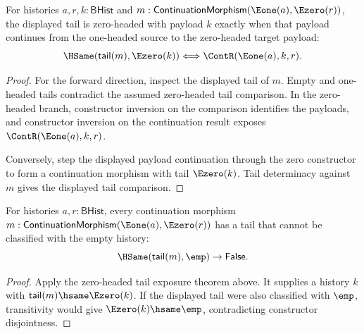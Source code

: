 \begin{theorem}
\label{thm:category-continuation-morphism-e1-source-e0-target-tail-e0-iff}
For histories $a,r,k:\mathsf{BHist}$ and
$m:\mathsf{ContinuationMorphism}(\Eone(a),\Ezero(r))$, the displayed tail is
zero-headed with payload $k$ exactly when that payload continues from the
one-headed source to the zero-headed target payload:
$$
\HSame(\mathsf{tail}(m),\Ezero(k))
\Longleftrightarrow
\ContR(\Eone(a),k,r).
$$
\end{theorem}
\begin{proof}
For the forward direction, inspect the displayed tail of $m$. Empty and
one-headed tails contradict the assumed zero-headed tail comparison. In the
zero-headed branch, constructor inversion on the comparison identifies the
payloads, and constructor inversion on the continuation result exposes
$\ContR(\Eone(a),k,r)$.

Conversely, step the displayed payload continuation through the zero
constructor to form a continuation morphism with tail $\Ezero(k)$. Tail
determinacy against $m$ gives the displayed tail comparison.
\end{proof}

\begin{theorem}
\label{thm:continuation-morphism-e1-source-e0-target-tail-not-empty}
For histories $a,r:\mathsf{BHist}$, every continuation morphism
$m:\mathsf{ContinuationMorphism}(\Eone(a),\Ezero(r))$ has a tail that cannot be
classified with the empty history:
$$
\HSame(\mathsf{tail}(m),\emp)\to\mathsf{False}.
$$
\end{theorem}
\begin{proof}
Apply the zero-headed tail exposure theorem above. It supplies a history $k$
with $\mathsf{tail}(m)\hsame\Ezero(k)$. If the displayed tail were also
classified with $\emp$, transitivity would give $\Ezero(k)\hsame\emp$,
contradicting constructor disjointness.
\end{proof}

